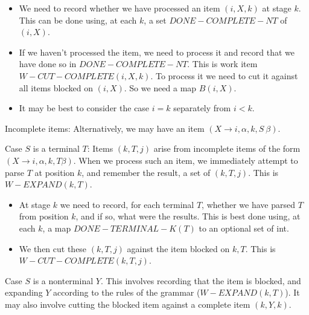 \documentclass[]{article}
\begin{document}
\begin{multicols}{2}
\begin{itemize}
\itemsep1pt\parskip0pt
\item
  We need to record whether we have processed an item \((i,X,k)\) at
  stage \(k\). This can be done using, at each \(k\), a set
  \(DONE-COMPLETE-NT\) of \((i,X)\).
\item
  If we haven't processed the item, we need to process it and record
  that we have done so in \(DONE-COMPLETE-NT\). This is work item
  \(W-CUT-COMPLETE(i,X,k)\). To process it we need to cut it against all
  items blocked on \((i,X)\). So we need a map \(B(i,X)\).
\item
  It may be best to consider the case \(i=k\) separately from \(i<k\).
\end{itemize}

Incomplete items: Alternatively, we may have an item
\((X \rightarrow{} i,\alpha,k,S\ \beta)\).

Case \(S\) is a terminal \(T\): Items \((k,T,j)\) arise from incomplete
items of the form \((X \rightarrow{} i,\alpha,k,T \beta)\). When we
process such an item, we immediately attempt to parse \(T\) at position
\(k\), and remember the result, a set of \((k,T,j)\). This is
\(W-EXPAND(k,T)\).

\begin{itemize}
\itemsep1pt\parskip0pt
\item
  At stage \(k\) we need to record, for each terminal \(T\), whether we
  have parsed \(T\) from position \(k\), and if so, what were the
  results. This is best done using, at each \(k\), a map
  \(DONE-TERMINAL-K(T)\) to an optional set of int.
\item
  We then cut these \((k,T,j)\) against the item blocked on \(k,T\).
  This is \(W-CUT-COMPLETE(k,T,j)\).
\end{itemize}

Case \(S\) is a nonterminal \(Y\). This involves recording that the item
is blocked, and expanding \(Y\) according to the rules of the grammar
(\(W-EXPAND(k,T)\)). It may also involve cutting the blocked item
against a complete item \((k,Y,k)\).


\end{multicols}
\end{document}
